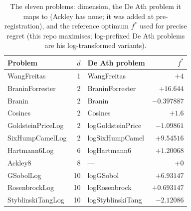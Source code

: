 \begin{table}[htbp]
\centering
\caption{The eleven problems: dimension, the De Ath problem it maps to (Ackley has none; it was added at pre-registration), and the reference optimum $f^*$ used for precise regret (this repo maximises; log-prefixed De Ath problems are his log-transformed variants).}
\label{tab:app-problems}
\small
\begin{tabular}{lrlr}
\toprule
Problem & $d$ & De Ath problem & $f^*$ \\
\midrule
WangFreitas & 1 & WangFreitas & $+4$ \\
BraninForrester & 2 & BraninForrester & $+16.644$ \\
Branin & 2 & Branin & $-0.397887$ \\
Cosines & 2 & Cosines & $+1.6$ \\
GoldsteinPriceLog & 2 & logGoldsteinPrice & $-1.09861$ \\
SixHumpCamelLog & 2 & logSixHumpCamel & $+9.54516$ \\
Hartmann6Log & 6 & logHartmann6 & $+1.20068$ \\
Ackley8 & 8 & --- & $+0$ \\
GSobolLog & 10 & logGSobol & $+6.93147$ \\
RosenbrockLog & 10 & logRosenbrock & $+0.693147$ \\
StyblinskiTangLog & 10 & logStyblinskiTang & $-2.12086$ \\
\bottomrule
\end{tabular}
\end{table}
